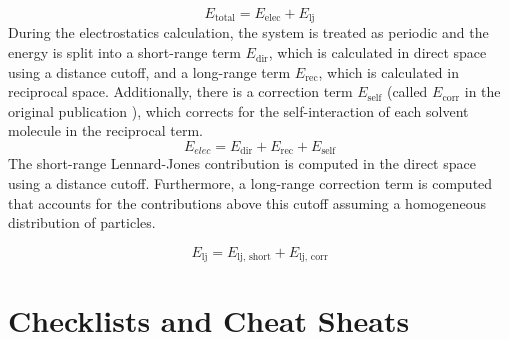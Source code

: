 \documentclass[9pt,tutorial]{livecoms}
\begin{document}
\begin{equation}
	E_\text{total} = E_\text{elec} + E_\text{lj}
\end{equation}
During the electrostatics calculation, the system is treated as periodic and the energy is split into a short-range term $E_\text{dir}$, which is calculated in direct space using a distance cutoff, and a long-range term $E_\text{rec}$, which is calculated in reciprocal space.
Additionally, there is a correction term $E_\text{self}$ (called $E_\text{corr}$ in the original publication \cite{Chen2021}), which corrects for the self-interaction of each solvent molecule in the reciprocal term.
\begin{equation}
	E_\textit{elec} = E_\text{dir} + E_\text{rec} + E_\text{self}
\end{equation}
The short-range Lennard-Jones contribution is computed in the direct space using a distance cutoff.
Furthermore, a long-range correction term is computed that accounts for the contributions above this cutoff assuming a homogeneous distribution of particles.

\begin{equation}
	E_\text{lj} = E_\text{lj,\ short} +  E_\text{lj,\ corr}
\end{equation}

\section{Checklists and Cheat Sheats} \label{sec:checklists}
\end{document}
